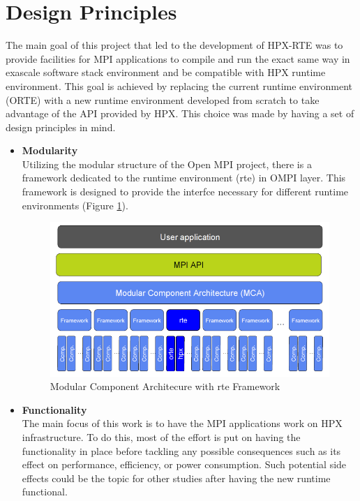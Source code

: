 \section{Design Principles}
\label{sec:design}
The main goal of this project that led to the development of HPX-RTE was to provide facilities for MPI applications to compile and run the exact same way in exascale software stack environment and be compatible with HPX runtime environment. This goal is achieved by replacing the current runtime environment (ORTE) with a new runtime environment developed from scratch to take advantage of the API provided by HPX. This choice was made by having a set of design principles in mind.

\begin{itemize}
\item \textbf{Modularity}\\
  Utilizing the modular structure of the Open MPI project, there is a framework dedicated to the runtime environment (rte) in OMPI layer. This framework is designed to provide the interfce necessary for different runtime environments (Figure \ref{fig:MCA-hpx-rte}).

\begin{figure}[ht]
\centering
\includegraphics[scale=0.5]{images/MCA-hpx-rte.png}
\caption[Modular Component Architecure with rte Framework]{Modular Component Architecure with rte Framework}
\label{fig:MCA-hpx-rte}
\end{figure}
  
\item \textbf{Functionality}\\
  The main focus of this work is to have the MPI applications work on HPX infrastructure. To do this, most of the effort is put on having the functionality in place before tackling any possible consequences such as its effect on performance, efficiency, or power consumption. Such potential side effects could be the topic for other studies after having the new runtime functional.
  

\end{itemize}

